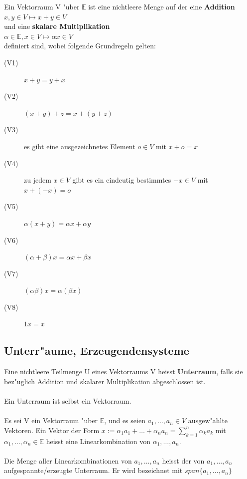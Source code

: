 \documentclass[10pt, a4paper, twocolumn]{scrartcl}
\begin{document}
Ein Vektorraum V "uber $\mathbb{E}$ ist eine nichtleere Menge auf der eine {\bf Addition}\\
$x,y\in V\mapsto x+y\in V$\\
und eine {\bf skalare Multiplikation}\\
$\alpha \in \mathbb{E},x\in V\mapsto \alpha x \in V$\\
definiert sind, wobei folgende Grundregeln gelten:
\begin{description}
 \item[(V1)] $x+y=y+x$
 \item[(V2)] $(x+y)+z=x+(y+z)$
 \item[(V3)] es gibt eine ausgezeichnetes Element $o\in V$  mit $x+o=x $
 \item[(V4)] zu jedem $x\in V$ gibt es ein eindeutig bestimmtes $-x\in V$ mit $x + (-x)=o$
 \item[(V5)] $\alpha(x+y)=\alpha x + \alpha y$
 \item[(V6)] $(\alpha + \beta)x=\alpha x + \beta x$
 \item[(V7)] $(\alpha \beta)x=\alpha(\beta x)$
 \item[(V8)] $1x=x$
\end{description}

\subsection{Unterr"aume, Erzeugendensysteme}

Eine nichtleere Teilmenge U eines Vektorraums V heisst {\bf Unterraum}, falls sie bez"uglich Addition und skalarer Multiplikation abgeschlossen ist.\\\\

Ein Unterraum ist selbst ein Vektorraum.\\\\

Es sei V ein Vektorraum "uber $\mathbb{E}$, und es seien $a_1,\ldots,a_n \in V$ ausgew"ahlte Vektoren. Ein Vektor der Form $x := \alpha_1 a_1+\ldots+\alpha_n a_n=\sum^{n}_{k=1}\alpha_k a_k$ mit $\alpha_1,\ldots,\alpha_n \in \mathbb{E}$ heisst eine Linearkombination von $\alpha_1,\ldots,a_n$.\\\\

Die Menge aller Linearkombinationen von $a_1,\ldots,a_n$ heisst der von $a_1,\ldots,a_n$ aufgespannte/erzeugte Unterraum. Er wird bezeichnet mit $span\{a_1,\ldots,a_n\}$\\
\end{document}
